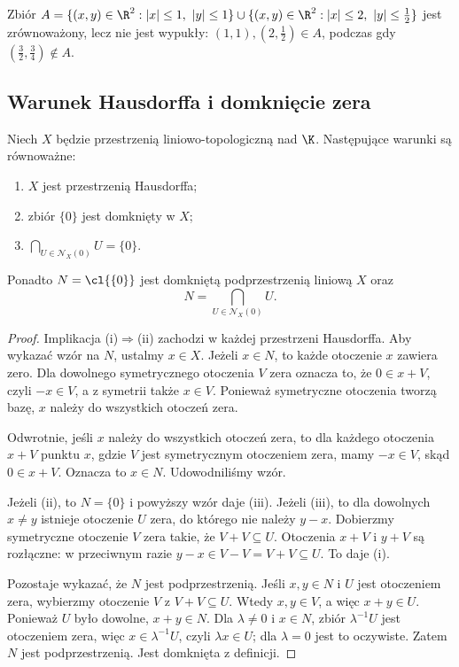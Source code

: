 \begin{przyklad}
Zbiór $A=\{(x,y)\in\R^2:|x|\leq1,\ |y|\leq1\}\cup
\{(x,y)\in\R^2:|x|\leq2,\ |y|\leq\frac12\}$
jest zrównoważony, lecz nie jest wypukły:
$(1,1),(2,\tfrac12)\in A$, podczas gdy
$(\tfrac32,\tfrac34)\notin A$.
\end{przyklad}

\subsection{Warunek Hausdorffa i domknięcie zera}

\begin{twierdzenie}\label{thm:hausdorff-zero}
Niech $X$ będzie przestrzenią liniowo-topologiczną nad $\K$.
Następujące warunki są równoważne:
\begin{enumerate}[label=\textup{(\roman*)}]
 \item $X$ jest przestrzenią Hausdorffa;
 \item zbiór $\{0\}$ jest domknięty w $X$;
 \item $\bigcap_{U\in\mathcal N_X(0)}U=\{0\}$.
\end{enumerate}
Ponadto $N=\cl{\{0\}}$ jest domkniętą podprzestrzenią liniową
$X$ oraz
\[
 N=\bigcap_{U\in\mathcal N_X(0)}U.
\]
\end{twierdzenie}
\begin{proof}
Implikacja (i)$\Rightarrow$(ii) zachodzi w każdej przestrzeni
Hausdorffa. Aby wykazać wzór na $N$, ustalmy $x\in X$.
Jeżeli $x\in N$, to każde otoczenie $x$ zawiera zero.
Dla dowolnego symetrycznego otoczenia $V$ zera oznacza to,
że $0\in x+V$, czyli $-x\in V$, a z symetrii także $x\in V$.
Ponieważ symetryczne otoczenia tworzą bazę, $x$ należy do
wszystkich otoczeń zera.

Odwrotnie, jeśli $x$ należy do wszystkich otoczeń zera,
to dla każdego otoczenia $x+V$ punktu $x$, gdzie $V$ jest
symetrycznym otoczeniem zera, mamy $-x\in V$, skąd
$0\in x+V$. Oznacza to $x\in N$. Udowodniliśmy wzór.

Jeżeli (ii), to $N=\{0\}$ i powyższy wzór daje (iii).
Jeżeli (iii), to dla dowolnych $x\ne y$ istnieje otoczenie
$U$ zera, do którego nie należy $y-x$. Dobierzmy symetryczne
otoczenie $V$ zera takie, że $V+V\subseteq U$. Otoczenia
$x+V$ i $y+V$ są rozłączne: w przeciwnym razie
$y-x\in V-V=V+V\subseteq U$. To daje (i).

Pozostaje wykazać, że $N$ jest podprzestrzenią.
Jeśli $x,y\in N$ i $U$ jest otoczeniem zera, wybierzmy
otoczenie $V$ z $V+V\subseteq U$. Wtedy $x,y\in V$,
a więc $x+y\in U$. Ponieważ $U$ było dowolne, $x+y\in N$.
Dla $\lambda\ne0$ i $x\in N$, zbiór $\lambda^{-1}U$
jest otoczeniem zera, więc $x\in\lambda^{-1}U$,
czyli $\lambda x\in U$; dla $\lambda=0$ jest to oczywiste.
Zatem $N$ jest podprzestrzenią. Jest domknięta z definicji.
\end{proof}

